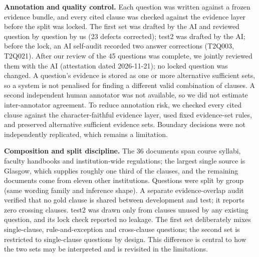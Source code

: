 \documentclass[conference]{IEEEtran}
\begin{document}
\begin{table}[t]
\centering
\caption{Corpus and question sets. Evidence groups are disjoint across splits.}
\label{tab:data}
\small
{}
\end{table}

\textbf{Annotation and quality control.}
Each question was written against a frozen evidence bundle, and every cited clause was checked against the evidence layer before the split was locked. The first set was drafted by the AI and reviewed question by question by us (23 defects corrected); test2 was drafted by the AI; before the lock, an AI self-audit recorded two answer corrections (T2Q003, T2Q021). After our review of the 45 questions was complete, we jointly reviewed them with the AI (attestation dated 2026-11-21); no locked question was changed. A question's evidence is stored as one or more alternative sufficient sets, so a system is not penalised for finding a different valid combination of clauses. A second independent human annotator was not available, so we did not estimate inter-annotator agreement. To reduce annotation risk, we checked every cited clause against the character-faithful evidence layer, used fixed evidence-set rules, and preserved alternative sufficient evidence sets. Boundary decisions were not independently replicated, which remains a limitation.

\textbf{Composition and split discipline.}
The 36 documents span course syllabi, faculty handbooks and institution-wide regulations; the largest single source is Glasgow, which supplies roughly one third of the clauses, and the remaining documents come from eleven other institutions. Questions were split by group (same wording family and inference shape). A separate evidence-overlap audit verified that no gold clause is shared between development and test; it reports zero crossing clauses. test2 was drawn only from clauses unused by any existing question, and its lock check reported no leakage. The first set deliberately mixes single-clause, rule-and-exception and cross-clause questions; the second set is restricted to single-clause questions by design. This difference is central to how the two sets may be interpreted and is revisited in the limitations.
\end{document}
